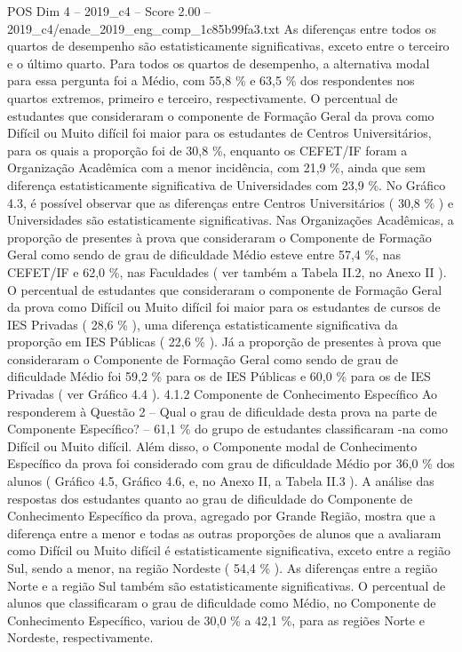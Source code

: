 \begin{textsample}{POS Dim 4 – 2019\_c4 – Score 2.00 – 2019\_c4/enade\_2019\_eng\_comp\_1c85b99fa3.txt}
As diferenças entre todos os quartos de desempenho são estatisticamente significativas, exceto entre o terceiro e o último quarto.
Para todos os quartos de desempenho, a alternativa modal para essa pergunta foi a Médio, com 55,8 \% e 63,5 \% dos respondentes nos quartos extremos, primeiro e terceiro, respectivamente.
O percentual de estudantes que consideraram o componente de Formação Geral da prova como Difícil ou Muito difícil foi maior para os estudantes de Centros Universitários, para os quais a proporção foi de 30,8 \%, enquanto os CEFET/IF foram a Organização Acadêmica com a menor incidência, com 21,9 \%, ainda que sem diferença estatisticamente significativa de Universidades com 23,9 \%.
No Gráfico 4.3, é possível observar que as diferenças entre Centros Universitários ( 30,8 \% ) e Universidades são estatisticamente significativas.
Nas Organizações Acadêmicas, a proporção de presentes à prova que consideraram o Componente de Formação Geral como sendo de grau de dificuldade Médio esteve entre 57,4 \%, nas CEFET/IF e 62,0 \%, nas Faculdades ( ver também a Tabela II.2, no Anexo II ).
O percentual de estudantes que consideraram o componente de Formação Geral da prova como Difícil ou Muito difícil foi maior para os estudantes de cursos de IES Privadas ( 28,6 \% ), uma diferença estatisticamente significativa da proporção em IES Públicas ( 22,6 \% ).
Já a proporção de presentes à prova que consideraram o Componente de Formação Geral como sendo de grau de dificuldade Médio foi 59,2 \% para os de IES Públicas e 60,0 \% para os de IES Privadas ( ver Gráfico 4.4 ). 4.1.2 Componente de Conhecimento Específico Ao responderem à Questão 2 – Qual o grau de dificuldade desta prova na parte de Componente Específico? – 61,1 \% do grupo de estudantes classificaram -na como Difícil ou Muito difícil.
Além disso, o Componente modal de Conhecimento Específico da prova foi considerado com grau de dificuldade Médio por 36,0 \% dos alunos ( Gráfico 4.5, Gráfico 4.6, e, no Anexo II, a Tabela II.3 ).
A análise das respostas dos estudantes quanto ao grau de dificuldade do Componente de Conhecimento Específico da prova, agregado por Grande Região, mostra que a diferença entre a menor e todas as outras proporções de alunos que a avaliaram como Difícil ou Muito difícil é estatisticamente significativa, exceto entre a região Sul, sendo a menor, na região Nordeste ( 54,4 \% ).
As diferenças entre a região Norte e a região Sul também são estatisticamente significativas.
O percentual de alunos que classificaram o grau de dificuldade como Médio, no Componente de Conhecimento Específico, variou de 30,0 \% a 42,1 \%, para as regiões Norte e Nordeste, respectivamente.

\end{textsample}

